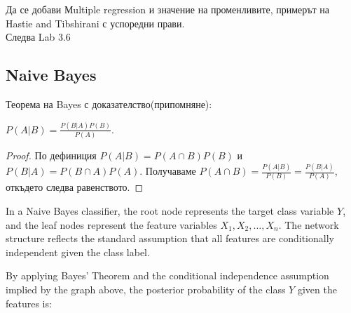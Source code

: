 	Да се добави Мultiple regression и значение на променливите, примерът на Hastie and Tibshirani с успоредни прави. \\
	
	Следва Lab 3.6 
	
	\subsection{Naive Bayes}
	
	Теорема на Bayes с доказателство(припомняне): 
	\begin{theorem}[Bayes]
		$P(A|B) = \frac{P(B|A)P(B)}{P(A)}.$
	\end{theorem}
	\begin{proof}
		По дефиниция $P(A|B) = P(A\cap B)P(B)$ и $P(B|A) = P(B\cap A)P(A)$. Получаваме
		$P(A\cap B)= \frac{P(A|B) }{P(B)} = \frac{P(B|A) }{P(A)}$, откъдето следва равенството.
	\end{proof}
	
			
		

		In a Naive Bayes classifier, the root node represents the target class variable $Y$, and the leaf nodes represent the feature variables $X_1, X_2, \dots, X_n$. The network structure reflects the standard assumption that all features are conditionally independent given the class label.
		
		\begin{center}
		\end{center}
		
		By applying Bayes' Theorem and the conditional independence assumption implied by the graph above, the posterior probability of the class $Y$ given the features is:
		
